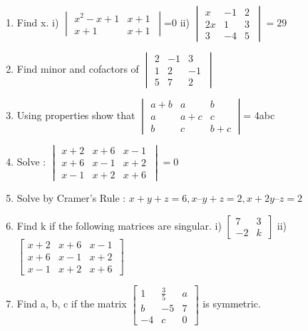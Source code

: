 \documentclass[14pt]{article}
\begin{document}
\begin{multicols}{2}
\begin{enumerate}[resume]
\item Find x.
i) $\begin{vmatrix} x^2-x+1 & x+1 \\x+1 & x+1 \,\end{vmatrix}$=0 
ii) $\begin{vmatrix} x & -1 & 2 \\ 2x & 1 & 3\,\\ 3 & -4 & 5\end{vmatrix}=29$ 

\item Find minor and cofactors of
 $\begin{vmatrix} 2 & -1 & 3 \\ 1 & 2 & -1\,\\ 5 & 7 & 2\end{vmatrix}$ 

\item Using properties show that
 $\begin{vmatrix} a+b & a & b \\ a & a+c & c\,\\ b & c & b+c\end{vmatrix}$= 4abc

\item Solve : 
 $\begin{vmatrix} x+2 & x+6 & x-1 \\ x+6 & x-1 & x+2\,\\ x-1 & x+2 & x+6\end{vmatrix}= 0$

\item Solve by Cramer's Rule :  $x+y+z = 6, x–y+z = 2, x+2y–z = 2$

\item Find k if the following matrices are singular. 
i) $\begin{bmatrix} 7 & 3 \\-2 & k \,\end{bmatrix}$
ii) $\begin{bmatrix} x+2 & x+6 & x-1 \\ x+6 & x-1 & x+2\,\\ x-1 & x+2 & x+6\end{bmatrix}$
 
\item Find a, b, c if the matrix $\begin{bmatrix} 1 & \frac{3}{5} & a \\ b & -5 & 7\,\\ -4 & c & 0\end{bmatrix}$ is symmetric.


\end{enumerate}
\end{multicols}
\end{document}
